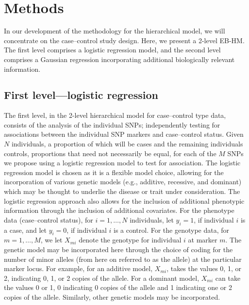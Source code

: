 \documentclass[oupdraft]{bio}
\begin{document}
\section{Methods}
\label{sec2}

In our development of the methodology for the hierarchical model,
we will concentrate on the case--control study design. Here, we
present a 2-level EB-HM. The first level comprises a logistic
regression model, and the second level comprises a Gaussian
regression incorporating additional biologically relevant
information.


\subsection{First level---logistic regression}

The first level, in the 2-level hierarchical model for
case--control type data, consists of the analysis of the
individual SNPs; independently testing for associations between
the individual SNP markers and case--control status. Given $N$
individuals, a proportion of which will be cases and the remaining
individuals controls, proportions that need not necessarily be
equal, for each of the $M$ SNPs we propose using a logistic
regression model to test for association. The logistic regression
model is chosen as it is a flexible model choice, allowing for the
incorporation of various genetic models (e.g., additive,
recessive, and dominant) which may be thought to underlie the
disease or trait under consideration. The logistic regression
approach also allows for the inclusion of additional phenotypic
information through the inclusion of additional covariates. For
the phenotype data (case--control status), for $i = 1, \ldots, N$
individuals, let $y_i = 1$, if individual $i$ is a case,
and let $y_i = 0$, if individual $i$ is a control. For the
genotype data, for $m = 1, \ldots, M$, we let $X_{mi}$
denote the genotype for individual $i$ at marker $m$. The
genetic model may be incorporated here through the
choice of coding for the number of minor alleles (from here on
referred to as the allele) at the particular marker locus. For
example, for an additive model, $X_{mi}$, takes the values 0, 1,
or 2, indicating 0, 1, or 2 copies of the allele. For a
dominant model, $X_{mi}$ can take the values 0 or 1, 0
indicating 0 copies of the allele and 1 indicating one or
2 copies of the allele. Similarly, other genetic models
may be incorporated.
\end{document}
